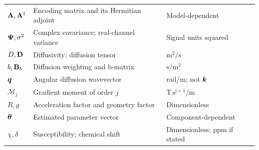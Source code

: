 \begin{longtable}{@{}p{}p{}p{}@{}}
$\mathbf{A},\mathbf{A}^{\dagger}$ & Encoding matrix and its Hermitian adjoint & Model-dependent\\
$\mathbf{\Psi},\sigma^2$ & Complex covariance; real-channel variance & Signal units squared\\
$D,\mathbf{D}$ & Diffusivity; diffusion tensor & $\si{\square\metre\per\second}$\\
$b,\mathbf{B}_b$ & Diffusion weighting and b-matrix & $\si{\second\per\square\metre}$\\
$\bm{q}$ & Angular diffusion wavevector & rad/m; not $\bm{k}$\\
$\mathcal M_j$ & Gradient moment of order $j$ & $\mathrm{T\,s^{j+1}/m}$\\
$R,g$ & Acceleration factor and geometry factor & Dimensionless\\
$\bm{\theta}$ & Estimated parameter vector & Component-dependent\\
$\chi,\delta$ & Susceptibility; chemical shift & Dimensionless; ppm if stated\\
\bottomrule
\end{longtable}
\renewcommand{\arraystretch}{1}
